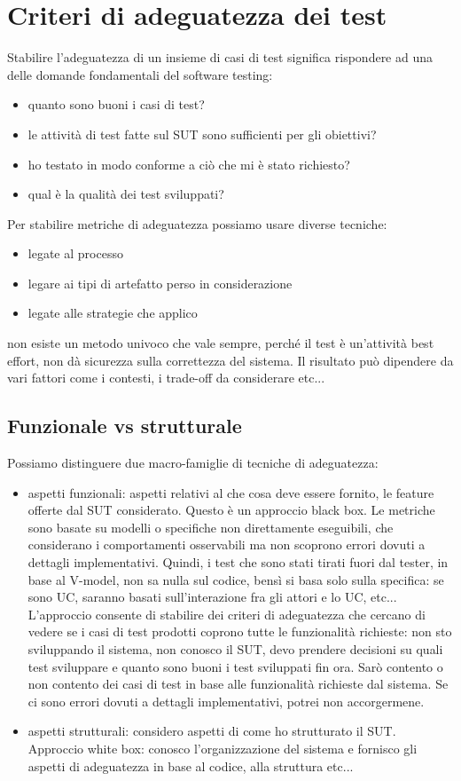 \documentclass{article}
\begin{document}
\section{Criteri di adeguatezza dei test}
Stabilire l'adeguatezza di un insieme di casi di test significa rispondere ad una delle domande fondamentali del software testing:
\begin{itemize}
\item quanto sono buoni i casi di test?
\item le attività di test fatte sul SUT sono sufficienti per gli obiettivi?
\item ho testato in modo conforme  a ciò che mi è stato richiesto? 
\item qual è la qualità dei test sviluppati?
\end{itemize}
Per stabilire metriche di adeguatezza possiamo usare diverse tecniche:
\begin{itemize}
\item legate al processo
\item legare ai tipi di artefatto perso in considerazione
\item legate alle strategie che applico
\end{itemize}
non esiste un metodo univoco che vale sempre, perché il test è un'attività best effort, non dà sicurezza sulla correttezza del sistema. Il risultato può dipendere da vari fattori come i contesti, i trade-off da considerare etc...
\subsection{Funzionale vs strutturale}
Possiamo distinguere due macro-famiglie di tecniche di adeguatezza:
\begin{itemize}
\item aspetti funzionali: aspetti relativi al che cosa deve essere fornito, le feature offerte dal SUT considerato. Questo è un approccio black box. Le metriche sono basate su modelli o specifiche non direttamente eseguibili, che considerano i comportamenti osservabili ma non scoprono errori dovuti a dettagli implementativi. Quindi, i test che sono stati tirati fuori dal tester, in base al V-model, non sa nulla sul codice, bensì si basa solo sulla specifica: se sono UC, saranno basati sull'interazione fra gli attori e lo UC, etc...\\ L'approccio consente di stabilire dei criteri di adeguatezza che cercano di vedere se i casi di test prodotti coprono tutte le funzionalità richieste: non sto sviluppando il sistema, non conosco il SUT, devo prendere decisioni su quali test sviluppare e quanto sono buoni i test sviluppati fin ora. Sarò contento o non contento dei casi di test in base alle funzionalità richieste dal sistema. Se ci sono errori dovuti a dettagli implementativi, potrei non accorgermene.
\item aspetti strutturali: considero aspetti di come ho strutturato il SUT. Approccio white box: conosco l'organizzazione del sistema e fornisco gli aspetti di adeguatezza in base al codice, alla struttura etc...
\end{itemize}
\end{document}
